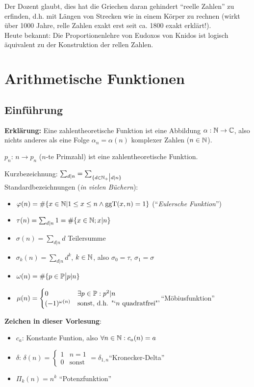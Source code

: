 \documentclass[a4paper,twoside,DIV15,BCOR12mm]{scrbook}
\begin{document}
Der Dozent glaubt, dies hat die Griechen daran gehindert "`reelle Zahlen"' zu erfinden, d.h. mit Längen von Strecken wie in einem Körper zu rechnen (wirkt über 1000 Jahre, relle Zahlen exakt erst seit ca. 1800 exakt erklärt!).\\
Heute bekannt: Die Proportionenlehre von Eudoxos von Knidos ist
logisch äquivalent zu der Konstruktion der rellen Zahlen.

\chapter{Arithmetische Funktionen}

\section{Einführung}
\textbf{Erklärung:} Eine zahlentheoretische Funktion ist eine Abbildung $\alpha: \mathbb{N} \to \mathbb{C}$, also nichts anderes als eine Folge $\alpha_n  = \alpha(n)$ komplexer Zahlen ($n \in \mathbb{N}$).\\

\begin{beispiel}
$p_n$: $n \to p_n$ ($n$-te Primzahl)  ist eine zahlentheoretische
Funktion.
\end{beispiel}

Kurzbezeichnung: $\sum_{d|n} = \sum_{\{d \in \mathbb{N}_+ \big| d|n\}}$\\
Standardbezeichnungen (\emph{in vielen Büchern}):
\begin{itemize}
    \item $\varphi(n) = \#\{x \in \mathbb{N} | 1 \le x \le n \wedge \mathop{\rm ggT}\nolimits(x,n) = 1\}$ ("`\emph{Eulersche Funktion}"')
    \item $\tau(n) = \sum_{d|n}1 = \#\{x \in \mathbb{N} ; x|n\}$
    \item $\sigma(n) = \sum_{d|n}d $ \glqq{}Teilersumme\grqq
    \item $\sigma_k(n) = \sum_{d|n}d^k$, $k\in\mathbb{N}$, also $\sigma_0 = \tau$, $\sigma_1=\sigma$
    \item $\omega(n) = \#\{p\in\mathbb{P}\big|p|n\}$
    \item $\mu(n) =
\begin{cases}
0 & \exists p\in\mathbb{P} : p^2|n \\
(-1)^{\omega(n)} & \text{sonst, d.h. "`$n$ quadratfrei"'}
\end{cases}$\quad\quad "`Möbiusfunktion"'
\end{itemize}

\textbf{Zeichen in dieser Vorlesung}:
\begin{itemize}
\item $c_a$: Konstante Funtion, also $\forall n\in\mathbb{N}: c_a(n) = a$
\item $\delta$: $\delta(n) =
\begin{cases}
1 & n=1 \\
0 & \text{sonst}
\end{cases} = \delta_{1,n}$\quad "`Kronecker-Delta"'
\item $\Pi_k(n) = n^k$ "`Potenzfunktion"'
\end{itemize}
\end{document}
